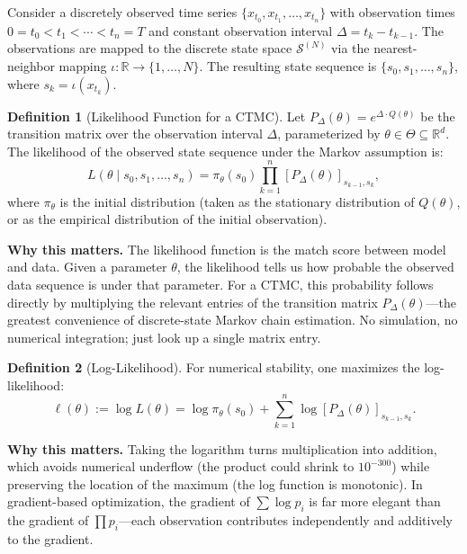 \documentclass[11pt,a4paper,openany]{book}
\theoremstyle{definition}
\newtheorem{definition}{Definition}[chapter]
\theoremstyle{plain}
\theoremstyle{remark}
\newcommand{\1}{\mathbbm{1}}
\newcommand{\R}{\mathbb{R}}
\newcommand{\calS}{\mathcal{S}}
\begin{document}
Consider a discretely observed time series $\{x_{t_{0}}, x_{t_{1}}, \ldots, x_{t_{n}}\}$ with observation times $0 = t_{0} < t_{1} < \cdots < t_{n} = T$ and constant observation interval $\Delta = t_{k} - t_{k-1}$. The observations are mapped to the discrete state space $\calS^{(N)}$ via the nearest-neighbor mapping $\iota: \R \to \{1, \ldots, N\}$. The resulting state sequence is $\{s_{0}, s_{1}, \ldots, s_{n}\}$, where $s_{k} = \iota(x_{t_{k}})$.

\begin{definition}[Likelihood Function for a CTMC]
Let $P_{\Delta}(\theta) = e^{\Delta \cdot Q(\theta)}$ be the transition matrix over the observation interval $\Delta$, parameterized by $\theta \in \Theta \subseteq \R^{d}$. The likelihood of the observed state sequence under the Markov assumption is:
\[
L(\theta \mid s_{0}, s_{1}, \ldots, s_{n}) = \pi_{\theta}(s_{0}) \prod_{k=1}^{n} [P_{\Delta}(\theta)]_{s_{k-1}, s_{k}},
\]
where $\pi_{\theta}$ is the initial distribution (taken as the stationary distribution of $Q(\theta)$, or as the empirical distribution of the initial observation).
\end{definition}

\medskip
\noindent\textbf{Why this matters.} The likelihood function is the match score between model and data. Given a parameter $\theta$, the likelihood tells us how probable the observed data sequence is under that parameter. For a CTMC, this probability follows directly by multiplying the relevant entries of the transition matrix $P_\Delta(\theta)$---the greatest convenience of discrete-state Markov chain estimation. No simulation, no numerical integration; just look up a single matrix entry.

\begin{definition}[Log-Likelihood]
For numerical stability, one maximizes the log-likelihood:
\[
\boxed{\ell(\theta) := \log L(\theta) = \log \pi_{\theta}(s_{0}) + \sum_{k=1}^{n} \log [P_{\Delta}(\theta)]_{s_{k-1}, s_{k}}}.
\]
\end{definition}

\medskip
\noindent\textbf{Why this matters.} Taking the logarithm turns multiplication into addition, which avoids numerical underflow (the product could shrink to $10^{-300}$) while preserving the location of the maximum (the log function is monotonic). In gradient-based optimization, the gradient of $\sum \log p_i$ is far more elegant than the gradient of $\prod p_i$---each observation contributes independently and additively to the gradient.
\end{document}
